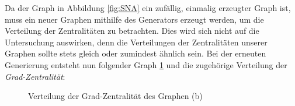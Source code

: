 Da der Graph in Abbildung \ref{fig:SNA} ein zufällig, einmalig erzeugter Graph ist, muss ein neuer Graphen mithilfe des Generators erzeugt werden, um die Verteilung der Zentralitäten zu betrachten. Dies wird sich nicht auf die Untersuchung auswirken, denn die Verteilungen der Zentralitäten unserer Graphen sollte stets gleich oder zumindest ähnlich sein. Bei der erneuten Generierung entsteht nun folgender Graph \ref{fig:distribution} und die zugehörige Verteilung der \textit{Grad-Zentralität}:

\FloatBarrier
\begin{figure}[h!]%
  \centering
  \qquad
  \caption{Verteilung der Grad-Zentralität des Graphen (b)}%
  \label{fig:distribution}
\end{figure}
\FloatBarrier

